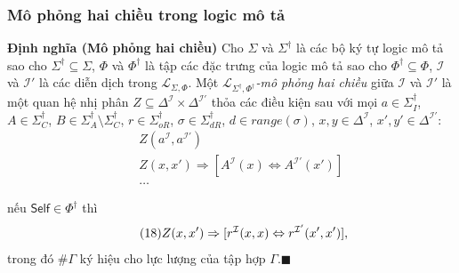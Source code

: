 \documentclass[notheorems,xcolor=dvipsnames]{beamer}
\newcommand{\mL}		{\mathcal{L}}
\newcommand{\mI}		{\mathcal{I}}
\newcommand{\SigmaDag}	{\Sigma^\dag}
\newcommand{\SigmaDagI}	{\Sigma^\dag_I}
\newcommand{\SigmaDagA}	{\Sigma^\dag_A}
\newcommand{\SigmaDagC}	{\Sigma^\dag_C}
\newcommand{\SigmaDagOR}{\Sigma^\dag_{oR}}
\newcommand{\SigmaDagDR}{\Sigma^\dag_{dR}}
\newcommand{\PhiDag}	{\Phi^\dag}
\newcommand{\Self}		{\mathsf{Self}}
\newcommand{\mLSP}		{\mL_{\Sigma,\Phi}}
\newcommand{\mLSPD}		{\mL_{\Sigma^\dag,\Phi^\dag}}
\newcommand{\myend}		{\mbox{}\hfill\mbox{{\tiny$\!\blacksquare$}}}
\newcommand{\Range}		{\mathit{range}}
\renewcommand{\sharp}		{\#}
\begin{document}
\begin{frame}\frametitle{\bf Mô phỏng hai chiều trong logic mô tả}
	\vspace{-1.0ex}
	\begin{block}{\bf Định nghĩa (Mô phỏng hai chiều)}
		\label{def:Bisimulation}
		\vspace{-1.0ex}
		Cho $\Sigma$ và $\SigmaDag$ là các bộ ký tự logic mô tả sao cho $\SigmaDag \subseteq \Sigma$, $\Phi$ và $\PhiDag$ là tập các đặc trưng của logic mô tả sao cho $\PhiDag \subseteq \Phi$, $\mI$ và $\mI'$ là các diễn dịch trong $\mLSP$.
		Một {\em $\mLSPD$-mô phỏng hai chiều} giữa $\mI$ và $\mI'$ là một quan hệ nhị phân $Z \subseteq \Delta^\mI \times \Delta^{\mI'}$ thỏa các điều kiện sau với mọi $a \in \SigmaDagI$, $A \in \SigmaDagC$, $B \in \SigmaDagA\setminus\SigmaDagC$, $r \in \SigmaDagOR$, $\sigma \in \SigmaDagDR$, $d \in \Range(\sigma)$, $x,y \in \Delta^\mI$, $x',y' \in \Delta^{\mI'}$:
		\begin{eqnarray}
			&&\!\!\!\!\!\!\!\!
			Z(a^\mI,a^{\mI'}) \label{bs:eqA} \\[0.5ex]
			&&\!\!\!\!\!\!\!\!
			Z(x,x') \Rightarrow [A^\mI(x) \Leftrightarrow A^{\mI'}(x')] \label{bs:eqB1} \\[0.5ex]
			&&\ldots
		\end{eqnarray}
		
		\vspace{-2.5ex}
		nếu $\Self \in \Phi^\dag$ thì
		\vspace{-2.5ex}
		\begin{equation}\tag{18}
		\vspace{-1.5ex}
			Z(x,x') \Rightarrow [r^\mI(x,x) \Leftrightarrow r^{\mI'}(x',x')], %
		\end{equation}
		trong đó $\sharp\Gamma$ ký hiệu cho lực lượng của tập hợp $\Gamma$.\myend
	\end{block}
\end{frame}
\end{document}
